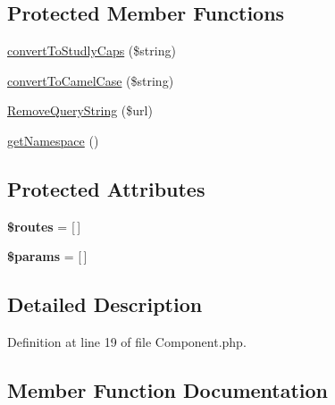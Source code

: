 \subsection*{Protected Member Functions}
\begin{DoxyCompactItemize}
\item 
\mbox{\hyperlink{class_zest_1_1_component_1_1_component_a6201cf73444ddfadfca25d437f49fd1b}{convert\+To\+Studly\+Caps}} (\$string)
\item 
\mbox{\hyperlink{class_zest_1_1_component_1_1_component_ac8113e94342833c6df305638210875f5}{convert\+To\+Camel\+Case}} (\$string)
\item 
\mbox{\hyperlink{class_zest_1_1_component_1_1_component_a3dd72e2d1640550f7a9a083d24a6b0ea}{Remove\+Query\+String}} (\$url)
\item 
\mbox{\hyperlink{class_zest_1_1_component_1_1_component_a2614df64646ac71b70b1e1074258052b}{get\+Namespace}} ()
\end{DoxyCompactItemize}
\subsection*{Protected Attributes}
\begin{DoxyCompactItemize}
\item 
\mbox{\label{class_zest_1_1_component_1_1_component_a8f7eb04a54e0f0bfc0cedeb9899ce4a8}} 
{\bfseries \$routes} = \mbox{[}$\,$\mbox{]}
\item 
\mbox{\label{class_zest_1_1_component_1_1_component_afe68e6fbe7acfbffc0af0c84a1996466}} 
{\bfseries \$params} = \mbox{[}$\,$\mbox{]}
\end{DoxyCompactItemize}


\subsection{Detailed Description}


Definition at line 19 of file Component.\+php.



\subsection{Member Function Documentation}
\mbox{\label{class_zest_1_1_component_1_1_component_ac897e899f8138035a0cffd811e66e511}} 
